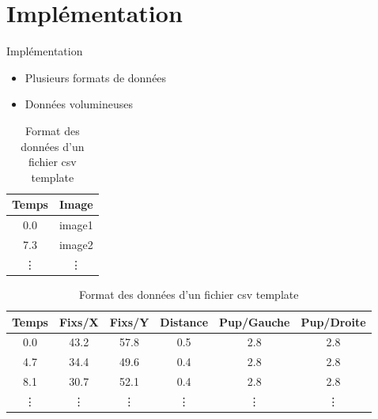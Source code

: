 \documentclass{beamer}
\begin{document}
\section{Implémentation}
\begin{frame}{Implémentation}
  \begin{itemize}
    \item Plusieurs formats de données
    \item Données volumineuses
  \end{itemize}

  \begin{table}[htpb]
    \begin{adjustwidth}{0.05\textwidth}{0cm}
      \begin{tabular}{|c||c|}
        \hline
        Temps  & Image  \\
        \hline
        0.0    & image1 \\
        7.3    & image2 \\
        \vdots & \vdots \\
        \hline
      \end{tabular}
      \newline
      \begin{tabular}{|c||c|c|c|c|c|}
        \hline
        Temps  & Fixs/X & Fixs/Y & Distance & Pup/Gauche & Pup/Droite \\
        \hline
        0.0    & 43.2   & 57.8   & 0.5      & 2.8        & 2.8        \\
        4.7    & 34.4   & 49.6   & 0.4      & 2.8        & 2.8        \\
        8.1    & 30.7   & 52.1   & 0.4      & 2.8        & 2.8        \\
        \vdots & \vdots & \vdots & \vdots   & \vdots     & \vdots     \\
        \hline
      \end{tabular}
    \end{adjustwidth}
    \caption{Format des données d'un fichier csv template}
  \end{table}
\end{frame}
\end{document}
